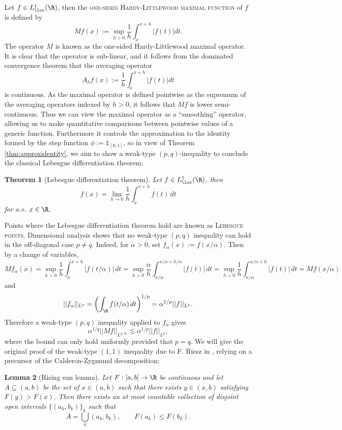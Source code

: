 \documentclass[reqno]{amsart}
\newtheorem{theorem}{Theorem}
\newtheorem{lemma}[theorem]{Lemma}
\theoremstyle{definition}
\theoremstyle{remark}
\renewcommand{\emph}{\textsc}
\begin{document}
Let $f \in L^1_{\loc} (\R)$, then the \emph{one-sided Hardy-Littlewood maximal function} of $f$ is defined by
	\[ Mf (x) := \sup_{h > 0} \frac1h \int_{x}^{x + h} |f (t)| dt. \]
The operator $M$ is known as the one-sided Hardy-Littlewood maximal operator. It is clear that the operator is sub-linear, and it follows from the dominated convergence theorem that the averaging operator
	\[ A_h f(x) := \frac1h \int_x^{x + h} |f(t)| dt \]
is continuous. As the maximal operator is defined pointwise as the supremum of the averaging operators indexed by $h > 0$, it follows that $Mf$ is lower semi-continuous. Thus we can view the maximal operator as a ``smoothing'' operator, allowing us to make quantitative comparisons between pointwise values of a generic function. Furthermore it controls the approximation to the identity formed by the step function $\phi := \mathbb 1_{[0, 1]}$, so in view of Theorem \ref{thm:approxidentity}, we aim to show a weak-type $(p, q)$-inequality to conclude the classical Lebesgue differentiation theorem;

\begin{theorem}[Lebesgue differentiation theorem]
	Let $f \in L^1_{\loc} (\R)$, then 
		\[ f(x) = \lim_{h \to 0} \frac1h \int_x^{x + h} f(t) \, dt \]
	for a.e. $x \in \R$. 
\end{theorem}
	
Points where the Lebesgue differentiation theorem hold are known as \emph{Lebesgue points}. Dimensional analysis shows that no weak-type $(p, q)$ inequality can hold in the off-diagonal case $p \neq q$. Indeed, for $\alpha > 0$, set $f_\alpha (x) := f(x/\alpha)$. Then by a change of variables, 
	\[ Mf_\alpha (x) = \sup_{h > 0} \frac1h \int_x^{x + h} |f(t/\alpha)| \, dt = \sup_{h > 0} \frac{\alpha}{h}\int_{x/\alpha}^{x/\alpha + h/\alpha} |f(t)| \, dt = \sup_{h > 0} \frac1h \int_{x/\alpha}^{x/\alpha + h} |f(t)| \, dt = Mf (x/\alpha) \]
and
	\[ ||f_\alpha||_{L^p} = \left( \int_\R f(t/\alpha) \, dt \right)^{1/p} = \alpha^{1/p} ||f||_{L^p}. \]
Therefore a weak-type $(p, q)$ inequality applied to $f_\alpha$ gives
	\[ \alpha^{1/q} || Mf ||_{L^{q,\infty}} \lesssim \alpha^{1/p} ||f||_{L^p}, \]
where the bound can only hold uniformly provided that $p = q$. We will give the original proof of the weak-type $(1, 1)$ inequality due to F. Riesz in \cite{Riesz1932}, relying on a precursor of the Calderon-Zygmund decomposition;

\begin{lemma}[Rising sun lemma]
	Let $F : [a,b] \to \R$ be continuous and let $A \subseteq (a, b)$ be the set of $x \in (a, b)$ such that there exists $y \in (x, b)$ satisfying $F(y) >F(x)$. Then there exists an at most countable collection of disjoint open intervals $\{(a_k, b_k)\}_k$ such that 
		\[  A = \bigcup_k (a_k, b_k), \qquad F(a_k) \leq F(b_k). \]	
\end{lemma}
\end{document}

